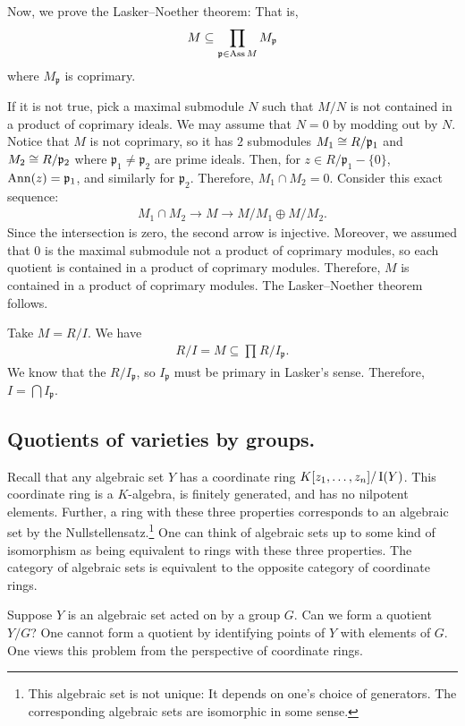 \documentclass [11 pt, oneside] {article}
\begin{document}
Now, we prove the Lasker--Noether theorem: That is, 
\begin{align*}
	M\subseteq \prod_{\mathfrak{p} \in \operatorname{Ass} M} M_{\mathfrak{p}}
\end{align*}
where $M_{\mathfrak{p}}$ is coprimary.  

If it is not true, pick a maximal submodule $N$ such that $M/N$ is not contained in a product of coprimary ideals. We may assume that $N=0$ by modding out by $N$. Notice that $M$ is not coprimary, so it has $2$ submodules $M_1\cong R/\mathfrak{p}_1$ and $M_2\cong R/\mathfrak{p}_2$ where $\mathfrak{p}_1\ne \mathfrak{p}_2$ are prime ideals. Then, for $z\in R/\mathfrak{p}_1- \{0\}$, $\operatorname{Ann}(z)= \mathfrak{p}_1$, and similarly for $\mathfrak{p}_2$. Therefore, $M_1\cap M_2=0$. Consider this exact sequence:
\begin{align*}
	M_1\cap M_2 \longrightarrow M\longrightarrow M/M_1 \oplus M/M_2.
\end{align*}
Since the intersection is zero, the second arrow is injective. Moreover, we assumed that $0$ is the maximal submodule not a product of coprimary modules, so each quotient is contained in a product of coprimary modules. Therefore, $M$ is contained in a product of coprimary modules. The Lasker--Noether theorem follows.

Take $M=R/I$. We have 
\begin{align*}
	R/I = M \subseteq \prod_{} R/I_{\mathfrak{p}}.
\end{align*}
We know that the $R/I_{\mathfrak{p}}$, so $I_{\mathfrak{p}}$ must be primary in Lasker's sense. Therefore, $I=\bigcap I_{\mathfrak{p}}$.

\subsection{Quotients of varieties by groups.}
Recall that any algebraic set $Y$ has a coordinate ring $K[z_1,\hdots, z_n]/\operatorname{I}(Y)$. This coordinate ring is a $K$-algebra, is finitely generated, and has no nilpotent elements. Further, a ring with these three properties corresponds to an algebraic set by the Nullstellensatz.\footnote{This algebraic set is not unique: It depends on one's choice of generators. The corresponding algebraic sets are isomorphic in some sense.} One can think of algebraic sets up to some kind of isomorphism as being equivalent to rings with these three properties. The category of algebraic sets is equivalent to the opposite category of coordinate rings. 

Suppose $Y$ is an algebraic set acted on by a group $G$. Can we form a quotient $Y/G$? One cannot form a quotient by identifying points of $Y$ with elements of $G$. One views this problem from the perspective of coordinate rings. 
\end{document}
